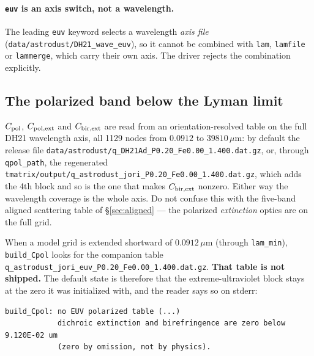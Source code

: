 \documentclass{my_memo}
\newcommand{\code}[1]{\texttt{#1}}
\newcommand{\um}{\ensuremath{\,\mu\mathrm{m}}}
\newcommand{\Cpol}{\ensuremath{C_{\rm pol}}}
\begin{document}
\paragraph{\code{euv} is an axis switch, not a wavelength.} The leading
\code{euv} keyword selects a wavelength \emph{axis file}
(\code{data/astrodust/DH21\_wave\_euv}), so it cannot be combined with
\code{lam}, \code{lamfile} or \code{lammerge}, which carry their own axis. The
driver rejects the combination explicitly.

\subsection{The polarized band below the Lyman limit}\label{sec:euvpol}

\Cpol, $C_{\rm pol,ext}$ and $C_{\rm bir,ext}$ are read from an
orientation-resolved table on the full DH21 wavelength axis, all 1129 nodes from
$0.0912$ to $39810\um$: by default the release file
\code{data/astrodust/q\_DH21Ad\_P0.20\_Fe0.00\_1.400.dat.gz}, or, through
\code{qpol\_path}, the regenerated
\code{tmatrix/output/q\_astrodust\_jori\_P0.20\_Fe0.00\_1.400.dat.gz}, which adds
the 4th block and so is the one that makes $C_{\rm bir,ext}$ nonzero. Either way
the wavelength coverage is the whole axis. Do not confuse this with the five-band
aligned scattering table of \S\ref{sec:aligned} --- the polarized
\emph{extinction} optics are on the full grid.

When a model grid is extended shortward of $0.0912\um$ (through \code{lam\_min}),
\code{build\_Cpol} looks for the companion table
\code{q\_astrodust\_jori\_euv\_P0.20\_Fe0.00\_1.400.dat.gz}. \textbf{That table is
not shipped.} The default state is therefore that the extreme-ultraviolet block
stays at the zero it was initialized with, and the reader says so on stderr:
\begin{lstlisting}[style=sh]
build_Cpol: no EUV polarized table (...)
            dichroic extinction and birefringence are zero below 9.120E-02 um
            (zero by omission, not by physics).
\end{lstlisting}
\end{document}
